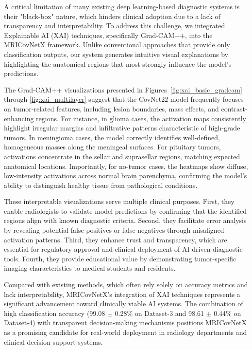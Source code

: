 \documentclass[a4paper,fleqn]{cas-sc}
\begin{document}
A critical limitation of many existing deep learning-based diagnostic systems is their "black-box" nature, which hinders clinical adoption due to a lack of transparency and interpretability. To address this challenge, we integrated Explainable AI (XAI) techniques, specifically Grad-CAM++, into the MRICovNetX framework. Unlike conventional approaches that provide only classification outputs, our system generates intuitive visual explanations by highlighting the anatomical regions that most strongly influence the model's predictions.

The Grad-CAM++ visualizations presented in Figures~\ref{fig:xai_basic_gradcam} through \ref{fig:xai_multilayer} suggest that the CovNet22 model frequently focuses on tumor-related features, including lesion boundaries, mass effects, and contrast-enhancing regions. For instance, in glioma cases, the activation maps consistently highlight irregular margins and infiltrative patterns characteristic of high-grade tumors. In meningioma cases, the model correctly identifies well-defined, homogeneous masses along the meningeal surfaces. For pituitary tumors, activations concentrate in the sellar and suprasellar regions, matching expected anatomical locations. Importantly, for no-tumor cases, the heatmaps show diffuse, low-intensity activations across normal brain parenchyma, confirming the model's ability to distinguish healthy tissue from pathological conditions.

These interpretable visualizations serve multiple clinical purposes. First, they enable radiologists to validate model predictions by confirming that the identified regions align with known diagnostic criteria. Second, they facilitate error analysis by revealing potential false positives or false negatives through misaligned activation patterns. Third, they enhance trust and transparency, which are essential for regulatory approval and clinical deployment of AI-driven diagnostic tools. Fourth, they provide educational value by demonstrating tumor-specific imaging characteristics to medical students and residents.

Compared with existing methods, which often rely solely on accuracy metrics and lack interpretability, MRICovNetX's integration of XAI techniques represents a significant advancement toward clinically viable AI systems. The combination of high classification accuracy (99.08 $\pm$ 0.28\% on Dataset-3 and 98.61 $\pm$ 0.44\% on Dataset-4) with transparent decision-making mechanisms positions MRICovNetX as a promising candidate for real-world deployment in radiology departments and clinical decision-support systems.
\end{document}
